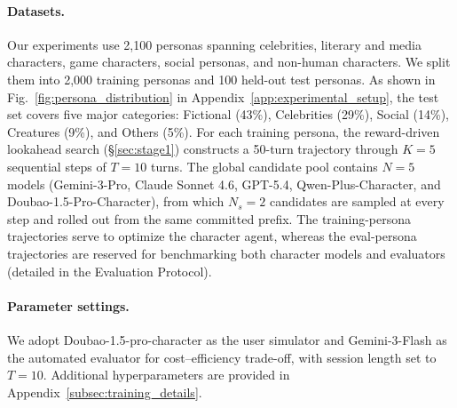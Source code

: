 \paragraph{Datasets.}
Our experiments use 2{,}100 personas spanning celebrities, literary and media characters, game characters, social personas, and non-human characters. We split them into 2{,}000 training personas and 100 held-out test personas. As shown in Fig.~\ref{fig:persona_distribution} in Appendix~\ref{app:experimental_setup}, the test set covers five major categories: Fictional (43\%), Celebrities (29\%), Social (14\%), Creatures (9\%), and Others (5\%). For each training persona, the reward-driven lookahead search (§\ref{sec:stage1}) constructs a 50-turn trajectory through $K=5$ sequential steps of $T=10$ turns. The global candidate pool contains $N=5$ models (Gemini-3-Pro, Claude Sonnet 4.6, GPT-5.4, Qwen-Plus-Character, and Doubao-1.5-Pro-Character), from which $N_s=2$ candidates are sampled at every step and rolled out from the same committed prefix.
The training-persona trajectories serve to optimize the character agent, whereas the eval-persona trajectories are reserved for benchmarking both character models and evaluators (detailed in the Evaluation Protocol).



\paragraph{Parameter settings.} We adopt Doubao-1.5-pro-character as the user simulator and Gemini-3-Flash as the automated evaluator for cost--efficiency trade-off, with session length set to $T=10$. Additional hyperparameters are provided in Appendix~\ref{subsec:training_details}.


